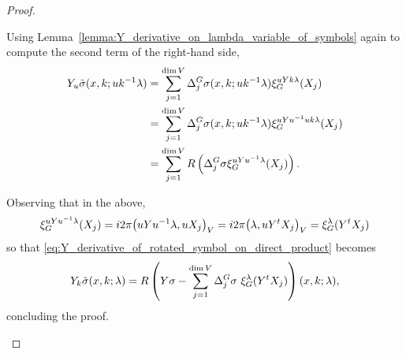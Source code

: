 \begin{proof}
\begin{enumerate}
            Using Lemma~\ref{lemma:Y_derivative_on_lambda_variable_of_symbols} again to compute the second term of the right-hand side,
            \begin{align*}
                {Y}_u \tilde \sigma(x, k; u k^{-1} \lambda)
                &= \sum_{j = 1}^{\dim V} {\Delta^{G}_{j}} \sigma (x, k; u k^{-1} \lambda) \xi^{u Y k \lambda}_{G} (X_j)\\
                &= \sum_{j = 1}^{\dim V} {\Delta^{G}_{j}} \sigma (x, k; u k^{-1} \lambda) \xi^{u Y u^{-1} u k \lambda}_{G} (X_j)\\
                &= \sum_{j = 1}^{\dim V} R\left({\Delta^{G}_{j}} \sigma \xi^{u Y u^{-1} \lambda}_{G} (X_j)\right).
            \end{align*}

            Observing that in the above,
            \begin{align*}
                \xi^{u Y u^{-1} \lambda}_{G} (X_j)
                = i 2 \pi {\left(u Y u^{-1} \lambda, u X_j\right)_{V}}
                = i 2 \pi {\left(\lambda, u Y^t X_j\right)_{V}}
                = \xi^{\lambda}_{G} (Y^t X_j)
            \end{align*}
            so that \eqref{eq:Y_derivative_of_rotated_symbol_on_direct_product} becomes
            \begin{align*}
                {Y}_k \tilde \sigma(x, k; \lambda)
                = R\left({Y} \sigma
                - \sum_{j = 1}^{\dim V} {\Delta^{G}_{j}} \sigma \ \xi^{\lambda}_{G} (Y^t X_j)
                \right)(x, k; \lambda),
            \end{align*}
            concluding the proof.
    \end{enumerate}
\end{proof}

